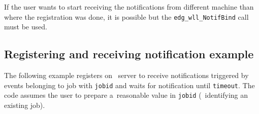 If the user wants to start receiving the notifications from different machine
than where the registration was done, it is possible but the
\verb'edg_wll_NotifBind' call must be used. 



\subsection{Registering and receiving notification example}

The following example registers on \LB\ server to receive notifications triggered by events belonging to job with \verb'jobid' and waits for notification until \verb'timeout'.
The code assumes the user to prepare a~reasonable value in \verb'jobid'
(\ie\ identifying an existing job).


